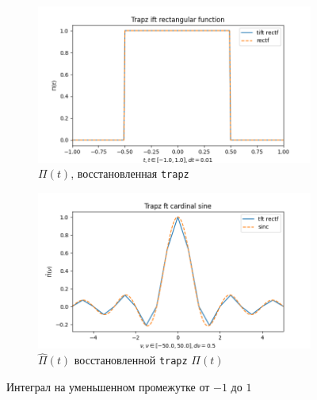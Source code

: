 \documentclass[a4paper, 12pt]{article}
\begin{document}
    \begin{figure}[H]
        \centering
        \begin{subfigure}{0.45\textwidth}
            \centering
            \includegraphics[width=\linewidth]{2_tiftr.png}
            \caption{$\Pi(t)$, восстановленная \texttt{trapz}}
            \label{fig:trectf2}
        \end{subfigure}
        \hspace{5mm}
        \begin{subfigure}{0.45\textwidth}
            \centering
            \includegraphics[width=\linewidth]{2_tftr.png}
            \caption{$\hat{\Pi}(t)$ восстановленной \texttt{trapz} $\Pi(t)$}
            \label{fig:tsinc2}
        \end{subfigure}
        \caption{Интеграл на уменьшенном промежутке от $-1$ до $1$}
        \label{fig:trapzs2}
    \end{figure}
    \vspace{-5mm}
\end{document}

